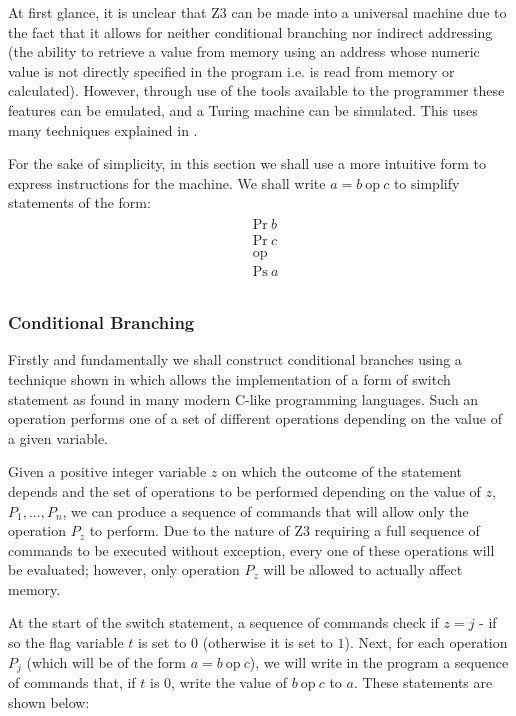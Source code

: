 \documentclass[Master.tex]{subfiles}
\begin{document}
At first glance, it is unclear that Z3 can be made into a universal machine due to the fact that it allows for neither conditional branching nor indirect addressing (the ability to retrieve a value from memory using an address whose numeric value is not directly specified in the program i.e. is read from memory or calculated). However, through use of the tools available to the programmer these features can be emulated, and a Turing machine can be simulated. This uses many techniques explained in \cite{rojas1998z3universal}.

For the sake of simplicity, in this section we shall use a more intuitive form to express instructions for the machine. We shall write $a = b\ \mathrm{op}\ c$ to simplify statements of the form:
\begin{gather*}
\begin{aligned}
&\mathrm{Pr}\ b\\
&\mathrm{Pr}\ c\\
&\textrm{op}\\ 
&\mathrm{Ps}\ a\\
\end{aligned}
\end{gather*}

\subsubsection{Conditional Branching}

Firstly and fundamentally we shall construct conditional branches using a technique shown in \cite{ibarra1983control} which allows the implementation of a form of switch statement as found in many modern C-like programming languages. Such an operation performs one of a set of different operations depending on the value of a given variable.

Given a positive integer variable $z$ on which the outcome of the statement depends and the set of operations to be performed depending on the value of $z$, $P_1, ... , P_n$, we can produce a sequence of commands that will allow only the operation $P_z$ to perform. Due to the nature of Z3 requiring a full sequence of commands to be executed without exception, every one of these operations will be evaluated; however, only operation $P_z$ will be allowed to actually affect memory.


At the start of the switch statement, a sequence of commands check if $z = j$ - if so the flag variable $t$ is set to $0$ (otherwise it is set to $1$). Next, for each operation $P_j$ (which will be of the form $a = b\ \mathrm{op}\ c$), we will write in the program a sequence of commands that, if $t$ is $0$, write the value of $b\ \mathrm{op}\ c$ to $a$. These statements are shown below:
\end{document}
